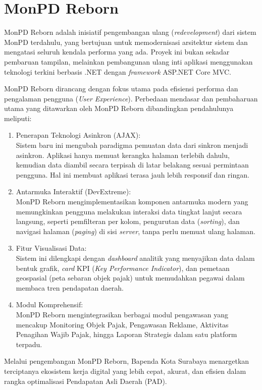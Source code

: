\section{MonPD Reborn}
\label{sec:monpd-reborn}

MonPD Reborn adalah inisiatif pengembangan ulang (\emph{redevelopment}) dari sistem MonPD terdahulu, yang bertujuan untuk memodernisasi arsitektur sistem dan mengatasi seluruh kendala performa yang ada. Proyek ini bukan sekadar pembaruan tampilan, melainkan pembangunan ulang inti aplikasi menggunakan teknologi terkini berbasis .NET dengan \emph{framework} ASP.NET Core MVC.

MonPD Reborn dirancang dengan fokus utama pada efisiensi performa dan pengalaman pengguna (\emph{User Experience}). Perbedaan mendasar dan pembaharuan utama yang ditawarkan oleh MonPD Reborn dibandingkan pendahulunya meliputi:

\begin{enumerate}
    \item Penerapan Teknologi Asinkron (AJAX): \\
    Sistem baru ini mengubah paradigma pemuatan data dari sinkron menjadi asinkron. Aplikasi hanya memuat kerangka halaman terlebih dahulu, kemudian data diambil secara terpisah di latar belakang sesuai permintaan pengguna. Hal ini membuat aplikasi terasa jauh lebih responsif dan ringan.
    \item Antarmuka Interaktif (DevExtreme): \\
    MonPD Reborn mengimplementasikan komponen antarmuka modern yang memungkinkan pengguna melakukan interaksi data tingkat lanjut secara langsung, seperti pemfilteran per kolom, pengurutan data (\emph{sorting}), dan navigasi halaman (\emph{paging}) di sisi \emph{server}, tanpa perlu memuat ulang halaman.
    \item Fitur Visualisasi Data: \\ 
    Sistem ini dilengkapi dengan \emph{dashboard} analitik yang menyajikan data dalam bentuk grafik, \emph{card} KPI (\emph{Key Performance Indicator}), dan pemetaan geospasial (peta sebaran objek pajak) untuk memudahkan pegawai dalam membaca tren pendapatan daerah.
    \item Modul Komprehensif: \\
    MonPD Reborn mengintegrasikan berbagai modul pengawasan yang mencakup Monitoring Objek Pajak, Pengawasan Reklame, Aktivitas Penagihan Wajib Pajak, hingga Laporan Strategis dalam satu platform terpadu.
\end{enumerate}

Melalui pengembangan MonPD Reborn, Bapenda Kota Surabaya menargetkan terciptanya ekosistem kerja digital yang lebih cepat, akurat, dan efisien dalam rangka optimalisasi Pendapatan Asli Daerah (PAD). 